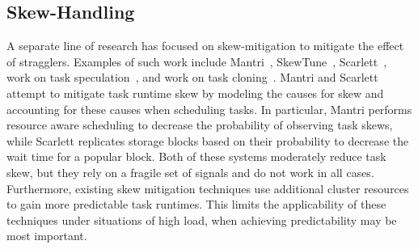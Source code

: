 \subsection{Skew-Handling}
A separate line of research has focused on skew-mitigation to
mitigate the effect of stragglers.
Examples of such work include
Mantri~\cite{ananthanarayanan2010reining}, SkewTune~\cite{kwon2012skewtune},
Scarlett~\cite{ananthanarayanan2011scarlett}, work on task
speculation~\cite{zaharia2008improving}, and work on task cloning~\cite{ananthanarayanan2013effective,dean2013the}. Mantri and Scarlett attempt to
mitigate task runtime skew by modeling the causes for skew and accounting for
these causes when scheduling tasks. In particular, Mantri performs resource aware scheduling to decrease the
probability of observing task skews, while Scarlett replicates storage blocks
based on their probability to decrease the wait time for a popular block. Both of these systems moderately reduce task skew, but they rely on a fragile set of
signals and do not work in all cases.
Furthermore, existing skew mitigation techniques use additional cluster resources to
gain more predictable task runtimes. This limits the applicability of these
techniques under situations of high load, when achieving predictability may be
most important.


